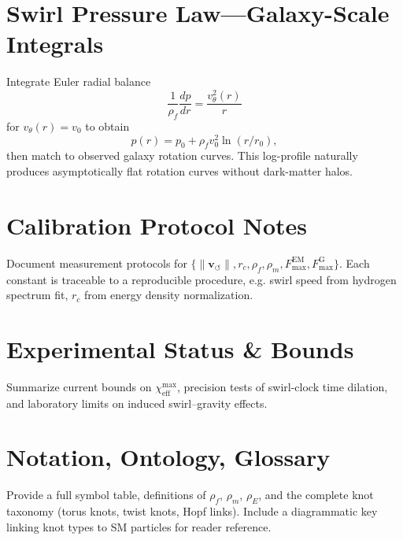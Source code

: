 \documentclass[reprint,aps,onecolumn,nofootinbib]{revtex4-2}
\begin{document}
    \section{Swirl Pressure Law—Galaxy-Scale Integrals}
    \label{canon58:appF}
    Integrate Euler radial balance
    \[
        \frac{1}{\rho_{\!f}}\frac{dp}{dr} = \frac{v_{\theta}^{2}(r)}{r}
    \]
    for $v_\theta(r)=v_0$ to obtain
    \[
        p(r) = p_0 + \rho_{\!f} v_0^{2} \ln(r/r_0),
    \]
    then match to observed galaxy rotation curves. This log-profile naturally
    produces asymptotically flat rotation curves without dark-matter halos.

    \section{Calibration Protocol Notes}
    \label{canon58:appG}
    Document measurement protocols for
    $\{\lVert \mathbf{v}_{\!\boldsymbol{\circlearrowleft}}\rVert, r_c, \rho_{\!f}, \rho_{\!m},
    F_{\max}^{\mathrm{EM}}, F_{\max}^{\mathrm{G}}\}$.
    Each constant is traceable to a reproducible procedure, e.g.
    swirl speed from hydrogen spectrum fit, $r_c$ from energy density normalization.

    \section{Experimental Status \& Bounds}
    \label{canon58:appH}
    Summarize current bounds on $\chi_{\mathrm{eff}}^{\max}$,
    precision tests of swirl-clock time dilation,
    and laboratory limits on induced swirl–gravity effects.

    \section{Notation, Ontology, Glossary}
    \label{canon58:appI}
    Provide a full symbol table, definitions of $\rho_{\!f}$, $\rho_{\!m}$, $\rho_{\!E}$,
    and the complete knot taxonomy (torus knots, twist knots, Hopf links).
    Include a diagrammatic key linking knot types to SM particles for reader reference.


\end{document}
